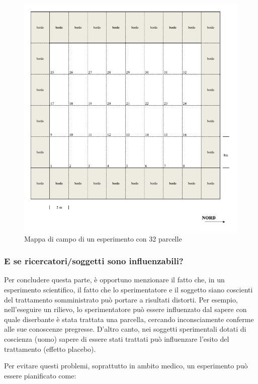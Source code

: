 \documentclass[a4paper,12pt,oneside]{book}
\begin{document}
\begin{figure}

{\centering \includegraphics[width=0.9\linewidth]{_images/Mappa1} 

}

\caption{Mappa di campo di un esperimento con 32 parcelle}\label{fig:figName31}
\end{figure}

\hypertarget{e-se-ricercatorisoggetti-sono-influenzabili}{%
\subsubsection{E se ricercatori/soggetti sono influenzabili?}\label{e-se-ricercatorisoggetti-sono-influenzabili}}

Per concludere questa parte, è opportuno menzionare il fatto che, in un esperimento scientifico, il fatto che lo sperimentatore e il soggetto siano coscienti del trattamento somministrato può portare a risultati distorti. Per esempio, nell'eseguire un rilievo, lo sperimentatore può essere influenzato dal sapere con quale diserbante è stata trattata una parcella, cercando inconsciamente conferme alle sue conoscenze pregresse. D'altro canto, nei soggetti sperimentali dotati di coscienza (uomo) sapere di essere stati trattati può influenzare l'esito del trattamento (effetto placebo).

Per evitare questi problemi, soprattutto in ambito medico, un esperimento può essere pianificato come:
\end{document}
